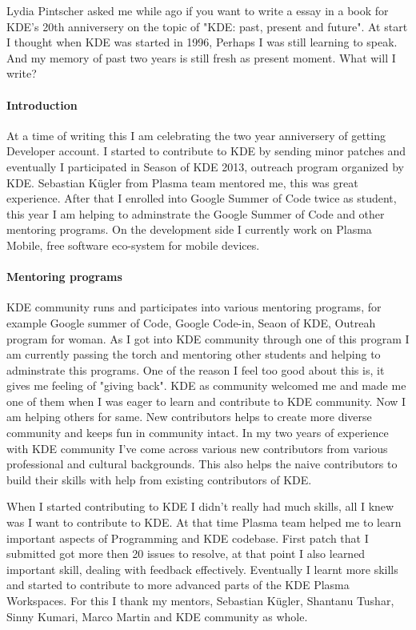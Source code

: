 

\noindent{}Lydia Pintscher asked me while ago if you want to write a essay in a book for KDE's 20th anniversery on the topic of "KDE: past, present and future". At start I thought when KDE was started in 1996, Perhaps I was still learning to speak. And my memory of past two years is still fresh as present moment. What will I write?

\paragraph{Introduction} At a time of writing this I am celebrating the two year anniversery of getting Developer account. I started to contribute to KDE by sending minor patches and eventually I participated in Season of KDE 2013, outreach program organized by KDE. Sebastian Kügler from Plasma team mentored me, this was great experience. After that I enrolled into Google Summer of Code twice as student, this year I am helping to adminstrate the Google Summer of Code and other mentoring programs. On the development side I currently work on Plasma Mobile, free software eco-system for mobile devices.

\paragraph{Mentoring programs} KDE community runs and participates into various mentoring programs, for example Google summer of Code, Google Code-in, Seaon of KDE, Outreah program for woman. As I got into KDE community through one of this program I am currently passing the torch and mentoring other students and helping to adminstrate this programs. One of the reason I feel too good about this is, it gives me feeling of "giving back". KDE as community welcomed me and made me one of them when I was eager to learn and contribute to KDE community. Now I am helping others for same. New contributors helps to create more diverse community and keeps fun in community intact. In my two years of experience with KDE community I've come across various new contributors from various professional and cultural backgrounds. This also helps the naive contributors to build their skills with help from existing contributors of KDE.

When I started contributing to KDE I didn't really had much skills, all I knew was I want to contribute to KDE. At that time Plasma team helped me to learn important aspects of Programming and KDE codebase. First patch that I submitted got more then 20 issues to resolve, at that point I also learned important skill, dealing with feedback effectively. Eventually I learnt more skills and started to contribute to more advanced parts of the KDE Plasma Workspaces. For this I thank my mentors, Sebastian Kügler, Shantanu Tushar, Sinny Kumari, Marco Martin and KDE community as whole.

